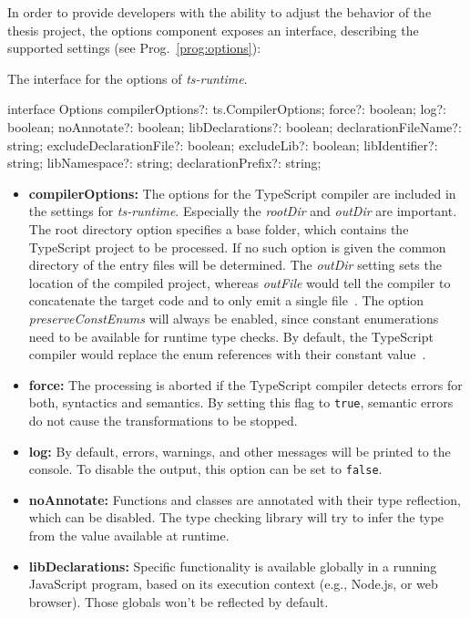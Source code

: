 In order to provide developers with the ability to adjust the behavior of the thesis project, the options component exposes an interface, describing the supported settings (see Prog.~\ref{prog:options}):
\begin{program}
\caption{The interface for the options of \emph{ts-runtime}.}
\label{prog:options}
\begin{JsCode}
interface Options {
  compilerOptions?: ts.CompilerOptions;
  force?: boolean;
  log?: boolean;
  noAnnotate?: boolean;
  libDeclarations?: boolean;
  declarationFileName?: string;
  excludeDeclarationFile?: boolean;
  excludeLib?: boolean;
  libIdentifier?: string;
  libNamespace?: string;
  declarationPrefix?: string;
}
\end{JsCode}
\end{program}
\begin{itemize}
  \item \textbf{compilerOptions:} The options for the TypeScript compiler are included in the settings for \emph{ts-runtime}. Especially the \emph{rootDir} and \emph{outDir} are important. The root directory option specifies a base folder, which contains the TypeScript project to be processed. If no such option is given the common directory of the entry files will be determined. The \emph{outDir} setting sets the location of the compiled project, whereas \emph{outFile} would tell the compiler to concatenate the target code and to only emit a single file~\cite{TypeScriptHandbook:CompilerOptions}. The option \emph{preserveConstEnums} will always be enabled, since constant enumerations need to be available for runtime type checks. By default, the TypeScript compiler would replace the enum references with their constant value~\cites{TypeScriptHandbook:CompilerOptions, TypeScriptSpec:ConstEnums}.
  \item \textbf{force:} The processing is aborted if the TypeScript compiler detects errors for both, syntactics and semantics. By setting this flag to \texttt{true}, semantic errors do not cause the transformations to be stopped.
  \item \textbf{log:} By default, errors, warnings, and other messages will be printed to the console. To disable the output, this option can be set to \texttt{false}.
  \item \textbf{noAnnotate:} Functions and classes are annotated with their type reflection, which can be disabled. The type checking library will try to infer the type from the value available at runtime.
  \item \textbf{libDeclarations:} Specific functionality is available globally in a running JavaScript program, based on its execution context (e.g., Node.js, or web browser). Those globals won't be reflected by default.

\end{itemize}
